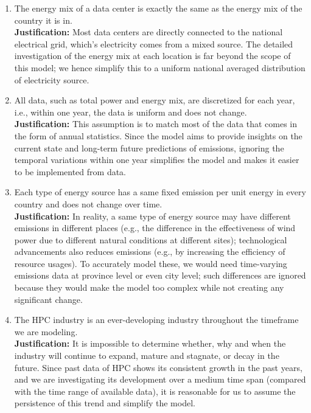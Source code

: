 \documentclass[12pt]{article}
\begin{document}
\begin{enumerate}
	\item The energy mix of a data center is exactly the same as the energy mix of the country it is in. \\
	\textbf{Justification:} Most data centers are directly connected to the national electrical grid, which's electricity comes from a mixed source. The detailed investigation of the energy mix at each location is far beyond the scope of this model; we hence simplify this to a uniform national averaged distribution of electricity source.

	\item All data, such as total power and energy mix, are discretized for each year, i.e., within one year, the data is uniform and does not change. \\
	\textbf{Justification:} This assumption is to match most of the data that comes in the form of annual statistics. Since the model aims to provide insights on the current state and long-term future predictions of  emissions, ignoring the temporal variations within one year simplifies the model and makes it easier to be implemented from data.

	\item Each type of energy source has a same fixed  emission per unit energy in every country and does not change over time. \\
	\textbf{Justification:} In reality, a same type of energy source may have different  emissions in different places (e.g., the difference in the effectiveness of wind power due to different natural conditions at different sites); technological advancements also reduces  emissions (e.g., by increasing the efficiency of resource usages). To accurately model these, we would need time-varying emissions data at province level or even city level; such differences are ignored because they would make the model too complex while not creating any significant change.

	\item The HPC industry is an ever-developing industry throughout the timeframe we are modeling. \\
	\textbf{Justification:} It is impossible to determine whether, why and when the industry will continue to expand, mature and stagnate, or decay in the future. Since past data of HPC shows its consistent growth in the past years, and we are investigating its development over a medium time span (compared with the time range of available data), it is reasonable for us to assume the persistence of this trend and simplify the model.


\end{enumerate}
\end{document}
